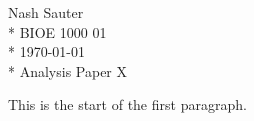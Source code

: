 \documentclass[12pt]{article}
\begin{document}
\noindent Nash Sauter \\*
\noindent BIOE 1000 01 \\*
\noindent \today \\*
\noindent Analysis Paper X

This is the start of the first paragraph.
\end{document}
